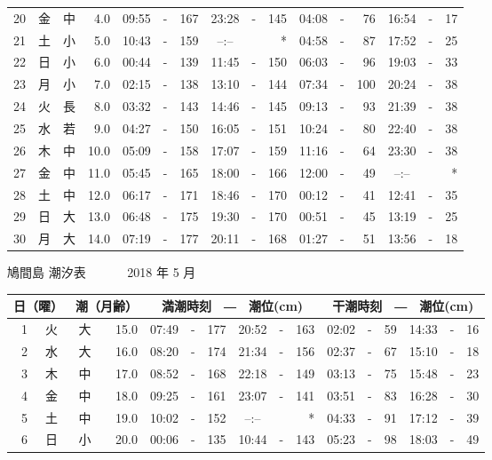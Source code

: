 \documentclass[12pt.a4j]{jsarticle}
\begin{document}
\begin{center}
\begin{table}[ht]
\begin{tabular}{|rc|cr|ccrccr|ccrccr|}
20 & 金 & 中 &  4.0 & 09:55 &-& 167 & 23:28 &-& 145 & 04:08 &-&  76 & 16:54 &-&  17 \\
21 & 土 & 小 &  5.0 & 10:43 &-& 159 & --:-- & &  *  & 04:58 &-&  87 & 17:52 &-&  25 \\
22 & 日 & 小 &  6.0 & 00:44 &-& 139 & 11:45 &-& 150 & 06:03 &-&  96 & 19:03 &-&  33 \\
23 & 月 & 小 &  7.0 & 02:15 &-& 138 & 13:10 &-& 144 & 07:34 &-& 100 & 20:24 &-&  38 \\
24 & 火 & 長 &  8.0 & 03:32 &-& 143 & 14:46 &-& 145 & 09:13 &-&  93 & 21:39 &-&  38 \\
25 & 水 & 若 &  9.0 & 04:27 &-& 150 & 16:05 &-& 151 & 10:24 &-&  80 & 22:40 &-&  38 \\
26 & 木 & 中 & 10.0 & 05:09 &-& 158 & 17:07 &-& 159 & 11:16 &-&  64 & 23:30 &-&  38 \\
27 & 金 & 中 & 11.0 & 05:45 &-& 165 & 18:00 &-& 166 & 12:00 &-&  49 & --:-- & &  *  \\
28 & 土 & 中 & 12.0 & 06:17 &-& 171 & 18:46 &-& 170 & 00:12 &-&  41 & 12:41 &-&  35 \\
29 & 日 & 大 & 13.0 & 06:48 &-& 175 & 19:30 &-& 170 & 00:51 &-&  45 & 13:19 &-&  25 \\
30 & 月 & 大 & 14.0 & 07:19 &-& 177 & 20:11 &-& 168 & 01:27 &-&  51 & 13:56 &-&  18 \\
\hline
\end{tabular}
\end{table}
\newpage
{\LARGE 鳩間島  潮汐表　　　}
{\large 2018 年  5 月}\\
\begin{table}[ht]
\begin{tabular}{|rc|cr|ccrccr|ccrccr|}
\hline
\multicolumn{2}{|c|}{日（曜）} & \multicolumn{2}{c|}{潮（月齢）} & \multicolumn{6}{c|}{満潮時刻　―　潮位(cm)} & \multicolumn{6}{c|}{干潮時刻　―　潮位(cm)} \\
\hline
 1 & 火 & 大 & 15.0 & 07:49 &-& 177 & 20:52 &-& 163 & 02:02 &-&  59 & 14:33 &-&  16 \\
 2 & 水 & 大 & 16.0 & 08:20 &-& 174 & 21:34 &-& 156 & 02:37 &-&  67 & 15:10 &-&  18 \\
 3 & 木 & 中 & 17.0 & 08:52 &-& 168 & 22:18 &-& 149 & 03:13 &-&  75 & 15:48 &-&  23 \\
 4 & 金 & 中 & 18.0 & 09:25 &-& 161 & 23:07 &-& 141 & 03:51 &-&  83 & 16:28 &-&  30 \\
 5 & 土 & 中 & 19.0 & 10:02 &-& 152 & --:-- & &  *  & 04:33 &-&  91 & 17:12 &-&  39 \\
 6 & 日 & 小 & 20.0 & 00:06 &-& 135 & 10:44 &-& 143 & 05:23 &-&  98 & 18:03 &-&  49 \\

\end{tabular}
\end{table}
\end{center}
\end{document}
